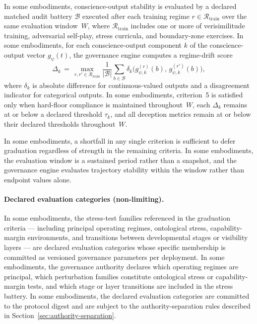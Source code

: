 \documentclass[a4paper,12pt]{article}
\begin{document}
\begin{enumerate}
    In some embodiments, conscience-output stability is evaluated by a
    declared matched audit battery $\mathcal{B}$ executed after each
    training regime $r \in \mathcal{R}_{\mathrm{train}}$ over the same
    evaluation window~$W$, where $\mathcal{R}_{\mathrm{train}}$
    includes one or more of verisimilitude training, adversarial
    self-play, stress curricula, and boundary-zone exercises. In some
    embodiments, for each conscience-output component $k$ of the
    conscience-output vector $g_{\psi}(t)$, the governance engine
    computes a regime-drift score
    \[
      \Delta_k \,=\,
      \max_{r,r' \in \mathcal{R}_{\mathrm{train}}}
      \frac{1}{|\mathcal{B}|}
      \sum_{b \in \mathcal{B}}
      \delta_k\!\bigl(g_{\psi,k}^{(r)}(b),\, g_{\psi,k}^{(r')}(b)\bigr),
    \]
    where $\delta_k$ is absolute difference for continuous-valued
    outputs and a disagreement indicator for categorical outputs. In
    some embodiments, criterion~5 is satisfied only when hard-floor
    compliance is maintained throughout~$W$, each $\Delta_k$ remains at
    or below a declared threshold $\tau_k$, and all deception metrics
    remain at or below their declared thresholds throughout~$W$.
\end{enumerate}

In some embodiments, a shortfall in any single criterion is sufficient
to defer graduation regardless of strength in the remaining criteria.
In some embodiments, the evaluation window is a sustained period
rather than a snapshot, and the governance engine evaluates trajectory
stability within the window rather than endpoint values alone.

\paragraph{Declared evaluation categories (non-limiting).}
In some embodiments, the stress-test families referenced in the
graduation criteria --- including principal operating regimes,
ontological stress, capability-margin environments, and transitions
between developmental stages or visibility layers --- are declared
evaluation categories whose specific membership is committed as
versioned governance parameters per deployment. In some embodiments,
the governance authority declares which operating regimes are
principal, which perturbation families constitute ontological stress or
capability-margin tests, and which stage or layer transitions are
included in the stress battery. In some embodiments, the declared
evaluation categories are committed to the protocol digest and are
subject to the authority-separation rules described in
Section~\ref{sec:authority-separation}.
\end{document}
